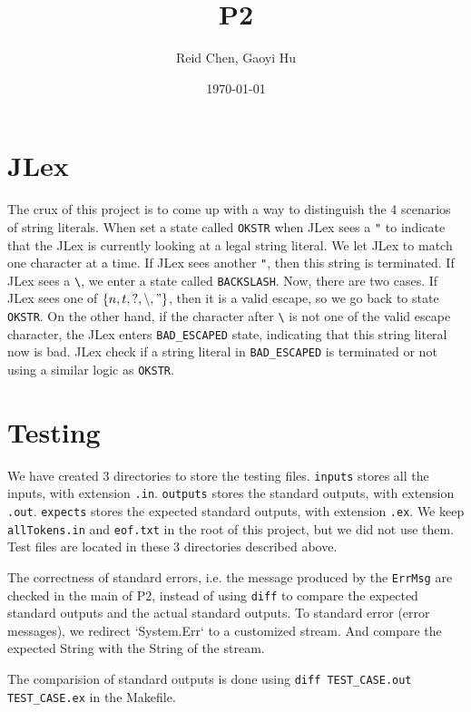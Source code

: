\documentclass[11pt]{article}
\author{Reid Chen, Gaoyi Hu}
\date{\today}
\title{P2}
\begin{document}
\maketitle
\tableofcontents


\section{JLex}
\label{sec:orgaba6dcb}
The crux of this project is to come up with a way to distinguish the 4 scenarios of
string literals. When set a state called \texttt{OKSTR} when JLex sees a \texttt{"} to indicate that the JLex is
currently looking at a legal string literal. We let JLex to match one
character at a time. If JLex sees another \texttt{"}, then this string is
terminated. If JLex sees a \texttt{\textbackslash{}}, we enter a state called \texttt{BACKSLASH}. Now,
there are two cases. If JLex sees one of \(\{n, t, ?, \backslash, "\}\), then it is a
valid escape, so we go back to state \texttt{OKSTR}. On the other hand, if the
character after \texttt{\textbackslash{}} is not one of the valid escape character, the JLex enters
\texttt{BAD\_ESCAPED} state, indicating that this string literal now is bad. JLex
check if a string literal in \texttt{BAD\_ESCAPED} is terminated or not using a
similar logic as \texttt{OKSTR}.
\section{Testing}
\label{sec:orgc76663f}
We have created 3 directories to store the testing files. \texttt{inputs} stores all
the inputs, with extension \texttt{.in}. \texttt{outputs} stores the standard outputs, with
extension \texttt{.out}. \texttt{expects} stores the
expected standard outputs, with extension \texttt{.ex}. We keep \texttt{allTokens.in} and
\texttt{eof.txt} in the root of this project, but we did not use them. Test files are
located in these 3 directories described above.

The correctness of standard errors, i.e. the
message produced by the \texttt{ErrMsg} are checked in the main of P2, instead of
using \texttt{diff} to compare the expected standard outputs and the actual standard outputs.
To standard error (error messages), we redirect `System.Err` to a customized
stream. And compare the expected String with the String of the stream.

The comparision of standard outputs is done using \texttt{diff TEST\_CASE.out
  TEST\_CASE.ex} in the Makefile.
\end{document}
